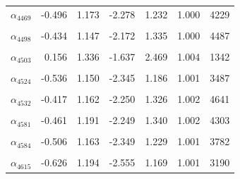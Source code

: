 \begin{longtable}{lrrrrrr}
$\alpha_{4469}$ & -0.496 & 1.173 & -2.278 & 1.232 & 1.000 & 4229\\
\cellcolor{gray!10}{$\alpha_{4478}$} & \cellcolor{gray!10}{-0.491} & \cellcolor{gray!10}{1.133} & \cellcolor{gray!10}{-2.308} & \cellcolor{gray!10}{1.227} & \cellcolor{gray!10}{1.000} & \cellcolor{gray!10}{4246}\\
$\alpha_{4498}$ & -0.434 & 1.147 & -2.172 & 1.335 & 1.000 & 4487\\
\cellcolor{gray!10}{$\alpha_{4500}$} & \cellcolor{gray!10}{-0.476} & \cellcolor{gray!10}{1.163} & \cellcolor{gray!10}{-2.260} & \cellcolor{gray!10}{1.305} & \cellcolor{gray!10}{1.004} & \cellcolor{gray!10}{4670}\\
$\alpha_{4503}$ & 0.156 & 1.336 & -1.637 & 2.469 & 1.004 & 1342\\
\cellcolor{gray!10}{$\alpha_{4522}$} & \cellcolor{gray!10}{-0.423} & \cellcolor{gray!10}{1.153} & \cellcolor{gray!10}{-2.180} & \cellcolor{gray!10}{1.272} & \cellcolor{gray!10}{1.000} & \cellcolor{gray!10}{4419}\\
$\alpha_{4524}$ & -0.536 & 1.150 & -2.345 & 1.186 & 1.001 & 3487\\
\cellcolor{gray!10}{$\alpha_{4527}$} & \cellcolor{gray!10}{-0.415} & \cellcolor{gray!10}{1.193} & \cellcolor{gray!10}{-2.247} & \cellcolor{gray!10}{1.397} & \cellcolor{gray!10}{1.002} & \cellcolor{gray!10}{4464}\\
$\alpha_{4532}$ & -0.417 & 1.162 & -2.250 & 1.326 & 1.002 & 4641\\
\cellcolor{gray!10}{$\alpha_{4572}$} & \cellcolor{gray!10}{-0.456} & \cellcolor{gray!10}{1.168} & \cellcolor{gray!10}{-2.282} & \cellcolor{gray!10}{1.337} & \cellcolor{gray!10}{1.002} & \cellcolor{gray!10}{4568}\\
$\alpha_{4581}$ & -0.461 & 1.191 & -2.249 & 1.340 & 1.002 & 4303\\
\cellcolor{gray!10}{$\alpha_{4583}$} & \cellcolor{gray!10}{-0.433} & \cellcolor{gray!10}{1.151} & \cellcolor{gray!10}{-2.209} & \cellcolor{gray!10}{1.326} & \cellcolor{gray!10}{1.002} & \cellcolor{gray!10}{4267}\\
$\alpha_{4584}$ & -0.506 & 1.163 & -2.349 & 1.229 & 1.001 & 3782\\
\cellcolor{gray!10}{$\alpha_{4586}$} & \cellcolor{gray!10}{-0.182} & \cellcolor{gray!10}{1.144} & \cellcolor{gray!10}{-1.843} & \cellcolor{gray!10}{1.698} & \cellcolor{gray!10}{1.001} & \cellcolor{gray!10}{3516}\\
$\alpha_{4615}$ & -0.626 & 1.194 & -2.555 & 1.169 & 1.001 & 3190\\

\end{longtable}
